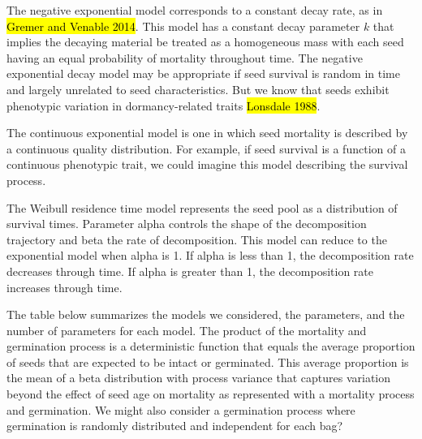 \documentclass[12pt, oneside, titlepage]{article}   	%
\begin{document}
The negative exponential model corresponds to a constant decay rate, as in \hl{Gremer and Venable 2014}. This model has a constant decay parameter $k$ that implies the decaying material be treated as a homogeneous mass with each seed having an equal probability of mortality throughout time. The negative exponential decay model may be appropriate if seed survival is random in time and largely unrelated to seed characteristics. But we know that seeds exhibit phenotypic variation in dormancy-related traits \hl{Lonsdale 1988}.

The continuous exponential model is one in which seed mortality is described by a continuous quality distribution. For example, if seed survival is a function of a continuous phenotypic trait, we could imagine this model describing the survival process. 

The Weibull residence time model represents the seed pool as a distribution of survival times. Parameter alpha controls the shape of the decomposition trajectory and beta the rate of decomposition. This model can reduce to the exponential model when alpha is 1. If alpha is less than 1, the decomposition rate decreases through time. If alpha is greater than 1, the decomposition rate increases through time. 

The table below summarizes the models we considered, the parameters, and the number of parameters for each model. The product of the mortality and germination process is a deterministic function that equals the average proportion of seeds that are expected to be intact or germinated. This average proportion is the mean of a beta distribution with process variance that captures variation beyond the effect of seed age on mortality as represented with a mortality process and germination.  We might also consider a germination process where germination is randomly distributed and independent for each bag?

\singlespace
\end{document}
